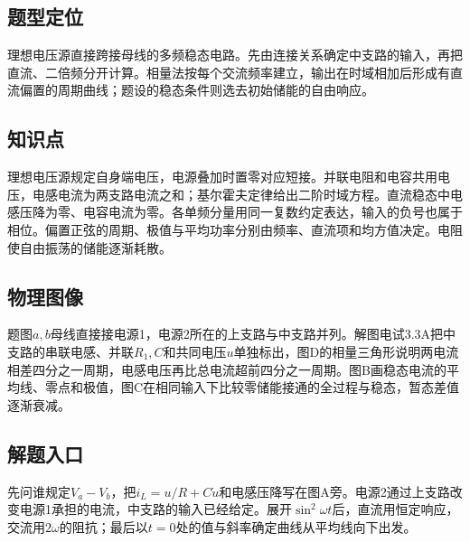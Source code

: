 \documentclass[UTF8,fontset=fandol,a4paper,11pt]{ctexart}
\begin{document}


\subsection*{题型定位}

理想电压源直接跨接母线的多频稳态电路。先由连接关系确定中支路的输入，再把直流、二倍频分开计算。相量法按每个交流频率建立，输出在时域相加后形成有直流偏置的周期曲线；题设的稳态条件则选去初始储能的自由响应。



\subsection*{知识点}

理想电压源规定自身端电压，电源叠加时置零对应短接。并联电阻和电容共用电压，电感电流为两支路电流之和；基尔霍夫定律给出二阶时域方程。直流稳态中电感压降为零、电容电流为零。各单频分量用同一复数约定表达，输入的负号也属于相位。偏置正弦的周期、极值与平均功率分别由频率、直流项和均方值决定。电阻使自由振荡的储能逐渐耗散。



\subsection*{物理图像}

题图$a,b$母线直接接电源1，电源2所在的上支路与中支路并列。解图电试3.3A把中支路的串联电感、并联$R_1,C$和共同电压$u$单独标出，图D的相量三角形说明两电流相差四分之一周期，电感电压再比总电流超前四分之一周期。图B画稳态电流的平均线、零点和极值，图C在相同输入下比较零储能接通的全过程与稳态，暂态差值逐渐衰减。



\subsection*{解题入口}

先问谁规定$V_a-V_b$，把$i_L=u/R+C\dot u$和电感压降写在图A旁。电源2通过上支路改变电源1承担的电流，中支路的输入已经给定。展开$\sin^2\omega t$后，直流用恒定响应，交流用$2\omega$的阻抗；最后以$t=0$处的值与斜率确定曲线从平均线向下出发。
\end{document}
